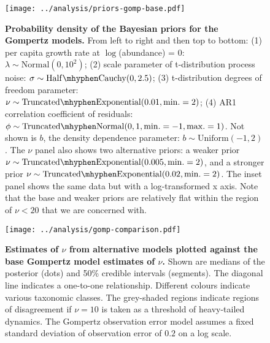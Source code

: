 \begin{figure}[htbp]
\begin{center}
\texttt{[image: ../analysis/priors-gomp-base.pdf]}

\caption{
  \textbf{Probability density of the Bayesian priors for the Gompertz models.} From
  left to right and then top to bottom: (1) per capita growth rate at
  $\log$(abundance) = $0$: $\lambda \sim \mathrm{Normal}(0, 10^2)$; (2) scale
  parameter of t-distribution process noise: $\sigma \sim \mathrm{Half\mhyphen
    Cauchy} (0, 2.5)$; (3) t-distribution degrees of freedom parameter: $\nu
  \sim \mathrm{Truncated\mhyphen Exponential}(0.01, \mathrm{min.} = 2)$; (4)
  AR1 correlation coefficient of residuals: $\phi \sim \mathrm{Truncated
    \mhyphen Normal}(0, 1, \mathrm{min.} = -1, \mathrm{max.} = 1)$. Not shown
  is $b$, the density dependence parameter: $b \sim \mathrm{Uniform}(-1, 2)$.
  The $\nu$ panel also shows two alternative priors: a weaker prior $\nu \sim
  \mathrm{Truncated\mhyphen Exponential}(0.005, \mathrm{min.} = 2)$, and a
  stronger prior $\nu \sim \mathrm{Truncated\mhyphen Exponential}(0.02,
  \mathrm{min.} = 2)$. The inset panel shows the same data but with a
  log-transformed x axis. Note that the base and weaker priors are relatively
  flat within the region of $\nu < 20$ that we are concerned with. }

\label{fig:priors}
\end{center}
\end{figure}

\clearpage

\begin{figure}[htbp]
\begin{center}
\texttt{[image: ../analysis/gomp-comparison.pdf]}

\caption{\textbf{Estimates of $\nu$ from alternative models
  plotted against the base Gompertz model estimates of $\nu$.} Shown are
  medians of the posterior (dots) and 50\% credible intervals (segments). The
  diagonal line indicates a one-to-one relationship. Different colours
  indicate various taxonomic classes. The grey-shaded regions indicate regions
  of disagreement if $\nu = 10$ is taken as a threshold of heavy-tailed
  dynamics. The Gompertz observation error model assumes a fixed standard
  deviation of observation error of $0.2$ on a log scale.}

\label{fig:alt}
\end{center}
\end{figure}

